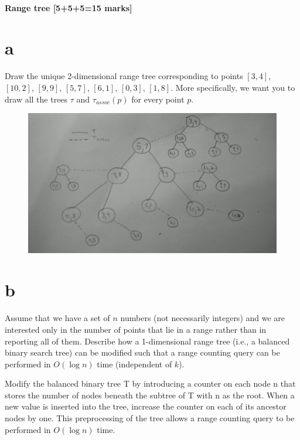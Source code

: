 \documentclass[12pt]{article}
\begin{document}
\subsection{Range tree [5+5+5=15 marks]}
\begin{enumerate}
\part{a} Draw the unique 2-dimensional range tree corresponding to points 
$[ 3, 4 ]$, $[ 10, 2 ]$, $[ 9, 9 ]$, $[ 5, 7 ]$, $[ 6, 1 ]$, $[ 0, 3 ]$, $[ 1, 8 ]$.
More specifically, we want you to draw all the trees $\tau$ and $\tau_{assoc}(p)$
for every point $p$.

\begin{figure}[ht!]
\centering
\includegraphics[width=170mm]{5a.jpg}
\label{overflow}
\end{figure}

\part{b} Assume that we have a set of $n$ numbers (not necessarily integers) and we are interested only in the number of points that lie in a range rather than in reporting all of them.  Describe how a 1-dimensional range tree (i.e., a balanced binary search tree) can be modified such that a range counting query can be performed in $O(\log{n})$ time
(independent of $k$). 

Modify the balanced binary tree T by introducing a counter on each node n that stores the number of nodes beneath the subtree of T with n as the root. When a new value is inserted into the tree, increase the counter on each of its ancestor nodes by one. This preprocessing of the tree allows a range counting query to be performed in $O(\log{n})$ time.\\\\


\end{enumerate}
\end{document}

